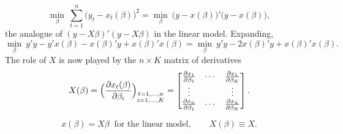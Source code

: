 \documentclass[11pt]{article}
\begin{document}
\[ \min_{\beta}\ \sum_{t=1}^{n}\bigl(y_{t} - x_{t}(\beta)\bigr)^{2}
   = \min_{\beta}\ \bigl(y - x(\beta)\bigr)'\bigl(y - x(\beta)\bigr), \]
the analogue of $(y - X\beta)'(y - X\beta)$ in the linear model. Expanding,
\[ \min_{\beta}\ y'y - y'x(\beta) - x(\beta)'y + x(\beta)'x(\beta)
   = \min_{\beta}\ y'y - 2x(\beta)'y + x(\beta)'x(\beta). \]
The role of $X$ is now played by the $n\times K$ matrix of derivatives
\[ X(\beta) = \Bigl(\frac{\partial x_{t}(\beta)}{\partial \beta_{i}}\Bigr)_{\substack{t = 1,\dots,n\\ i = 1,\dots,K}}
   = \begin{bmatrix}
       \frac{\partial x_{1}}{\partial \beta_{1}} & \cdots & \frac{\partial x_{1}}{\partial \beta_{K}}\\
       \vdots & & \vdots\\
       \frac{\partial x_{n}}{\partial \beta_{1}} & \cdots & \frac{\partial x_{n}}{\partial \beta_{K}}
     \end{bmatrix}. \]

\[ x(\beta) = X\beta \ \text{ for the linear model}, \qquad X(\beta) \equiv X. \]
\end{document}

